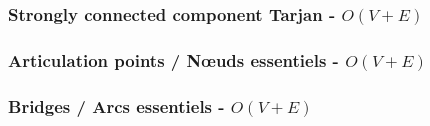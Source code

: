 \documentclass[landscape,a4paper,twocolumn,10pt]{report}
\begin{document}
\subsubsection{Strongly connected component Tarjan - $O(V + E)$}


%

\subsubsection{Articulation points / N\oe uds essentiels - $O(V + E)$}


\subsubsection{Bridges / Arcs essentiels - $O(V + E)$}

\end{document}
